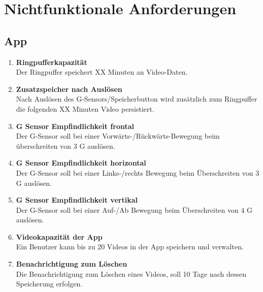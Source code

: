 \chapter{Nichtfunktionale Anforderungen}

\section{App}
\begin{enumerate}
\renewcommand{\labelenumi}{\textbf{\theenumi}}
\renewcommand{\theenumi}{NA\arabic{enumi}0}
\setcounter{enumi}{99}
\item \textbf{Ringpufferkapazität} \hfill\\ Der Ringpuffer speichert XX Minuten an Video-Daten.

\item \textbf{Zusatzspeicher nach Auslösen} \hfill\\ Nach Auslösen des G-Sensors/Speicherbutton wird zusätzlich zum Ringpuffer die folgenden XX Minuten Video persistiert.

\item \label{na:GSensfront}\textbf{G Sensor Empfindlichkeit frontal} \hfill\\  Der G-Sensor soll bei einer Vorwärts-/Rückwärts-Bewegung beim überschreiten von 3 G auslösen.

\item \textbf{G Sensor Empfindlichkeit horizontal} \hfill\\  Der G-Sensor soll bei einer Links-/rechts Bewegung beim Überschreiten von 3 G auslösen.

\item \label{na:GSensvert}\textbf{G Sensor Empfindlichkeit vertikal} \hfill\\  Der G-Sensor soll bei einer Auf-/Ab Bewegung beim Überschreiten von 4 G auslösen.

\item \textbf{Videokapazität der App} \hfill\\  Ein Benutzer kann bis zu 20 Videos in der App speichern und verwalten.

\item \textbf{Benachrichtigung zum Löschen} \hfill\\  Die Benachrichtigung zum Löschen eines Videos, soll 10 Tage nach dessen Speicherung erfolgen.
\end{enumerate}

